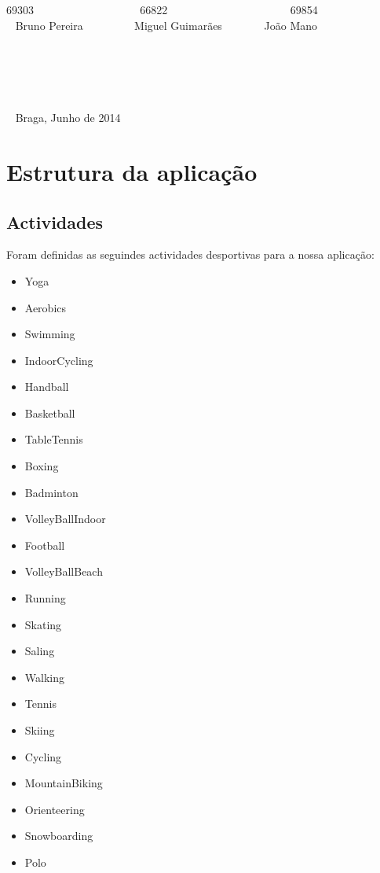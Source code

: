 \documentclass[10pt,notitlepage]{article}
\begin{document}
\begin{titlepage}
\begin{center}
69303 ~~~~~~~~~~~~~~~~~~ 66822 ~~~~~~~~~~~~~~~~~~~~~ 69854   \\~ Bruno Pereira  ~~~~~~~~ Miguel Guimarães ~~~~~~~João Mano  \\~ \\~ \\~ \\~ \\~ \\~ Braga, Junho de 2014
\end{center}
\end{titlepage}




\tableofcontents

\newpage


\section{Estrutura da aplicação}

\subsection{Actividades}
Foram definidas as seguindes actividades desportivas para a nossa aplicação:
\begin{multicols}{2} 
\begin{itemize}
\item Yoga 
\item Aerobics
\item Swimming
\item IndoorCycling
\item Handball
\item Basketball
\item TableTennis
\item Boxing
\item Badminton
\item VolleyBallIndoor
\item Football
\item VolleyBallBeach
\item Running
\item Skating
\item Saling
\item Walking
\item Tennis
\item Skiing
\item Cycling
\item MountainBiking
\item Orienteering
\item Snowboarding
\item Polo
\end{itemize}
\end{multicols}
\end{document}
